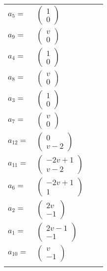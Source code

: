 \documentclass[1p]{elsarticle_modified}
\theoremstyle{definition}
\begin{document}
\begin{tabular}{m{7pt} m{180pt} m{7pt} m{180pt} }
\flushright $a_{5}=$&$\begin{pmatrix}1\\0\end{pmatrix}$ \\
\flushright $a_{9}=$&$\begin{pmatrix}v\\0\end{pmatrix}$ \\
\flushright $a_{4}=$&$\begin{pmatrix}1\\0\end{pmatrix}$ \\
\flushright $a_{8}=$&$\begin{pmatrix}v\\0\end{pmatrix}$ \\
\flushright $a_{3}=$&$\begin{pmatrix}1\\0\end{pmatrix}$ \\
\flushright $a_{7}=$&$\begin{pmatrix}v\\0\end{pmatrix}$ \\
\flushright $a_{12}=$&$\begin{pmatrix}0\\v-2\end{pmatrix}$ \\
\flushright $a_{11}=$&$\begin{pmatrix}-2 v+1\\v-2\end{pmatrix}$ \\
\flushright $a_{6}=$&$\begin{pmatrix}-2 v+1\\1\end{pmatrix}$ \\
\flushright $a_{2}=$&$\begin{pmatrix}2 v\\-1\end{pmatrix}$ \\
\flushright $a_{1}=$&$\begin{pmatrix}2 v-1\\-1\end{pmatrix}$ \\
\flushright $a_{10}=$&$\begin{pmatrix}v\\-1\end{pmatrix}$\\&\end{tabular}
\end{document}

